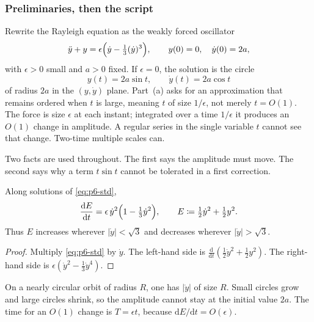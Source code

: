 \setcounter{section}{6}
\setcounter{theorem}{0}
\setcounter{definition}{0}
\setcounter{remark}{0}
\setcounter{note}{0}

\subsubsection{Preliminaries, then the script}

Rewrite the Rayleigh equation as the weakly forced oscillator
\begin{equation}
\label{eq:p6-std}
\ddot y+y
=
\epsilon\Bigl(\dot y-\tfrac13(\dot y)^3\Bigr),
\qquad
y(0)=0,\quad \dot y(0)=2a,
\end{equation}
with \(\epsilon>0\) small and \(a>0\) fixed. If \(\epsilon=0\), the solution is the circle
\begin{equation}
\label{eq:p6-linear}
y(t)=2a\sin t,
\qquad
\dot y(t)=2a\cos t
\end{equation}
of radius \(2a\) in the \((y,\dot y)\) plane. Part~(a) asks for an approximation that remains ordered when \(t\) is large, meaning \(t\) of size \(1/\epsilon\), not merely \(t=O(1)\). The force is size \(\epsilon\) at each instant; integrated over a time \(1/\epsilon\) it produces an \(O(1)\) change in amplitude. A regular series in the single variable \(t\) cannot see that change. Two-time multiple scales can.

Two facts are used throughout. The first says the amplitude must move. The second says why a term \(t\sin t\) cannot be tolerated in a first correction.

\begin{lemma}[Energy]
\label{lem:p6-energy}
Along solutions of \eqref{eq:p6-std},
\begin{equation}
\label{eq:p6-energy}
\frac{\mathrm{d}E}{\mathrm{d}t}
=
\epsilon\,\dot y^2\Bigl(1-\tfrac13\dot y^2\Bigr),
\qquad
E
\coloneqq
\tfrac12\dot y^2+\tfrac12 y^2.
\end{equation}
Thus \(E\) increases wherever \(\lvert\dot y\rvert<\sqrt{3}\) and decreases wherever \(\lvert\dot y\rvert>\sqrt{3}\).
\end{lemma}

\begin{proof}
Multiply \eqref{eq:p6-std} by \(\dot y\). The left-hand side is \(\frac{\mathrm{d}}{\mathrm{d}t}(\frac12\dot y^2+\frac12 y^2)\). The right-hand side is \(\epsilon(\dot y^2-\frac13\dot y^4)\).
\end{proof}

On a nearly circular orbit of radius \(R\), one has \(\lvert\dot y\rvert\) of size \(R\). Small circles grow and large circles shrink, so the amplitude cannot stay at the initial value \(2a\). The time for an \(O(1)\) change is \(T=\epsilon t\), because \(\mathrm{d}E/\mathrm{d}t=O(\epsilon)\).

